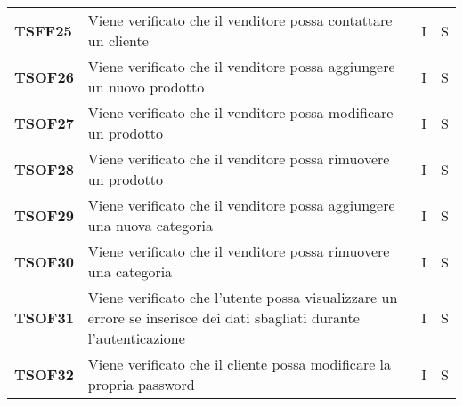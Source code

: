 \begin{center}
\begin{longtable}[!h]{p{60px} p{240px} p{35px} p{35px}}
        \textbf{TSFF25} & Viene verificato che il venditore possa contattare un cliente                                                        & I              & S              \\
        \textbf{TSOF26} & Viene verificato che il venditore possa aggiungere un nuovo prodotto                                                 & I              & S              \\
        \textbf{TSOF27} & Viene verificato che il venditore possa modificare un prodotto                                                       & I              & S              \\
        \textbf{TSOF28} & Viene verificato che il venditore possa rimuovere un prodotto                                                        & I              & S              \\
        \textbf{TSOF29} & Viene verificato che il venditore possa aggiungere una nuova categoria                                               & I              & S              \\
        \textbf{TSOF30} & Viene verificato che il venditore possa rimuovere una categoria                                                      & I              & S              \\
        \textbf{TSOF31} & Viene verificato che l'utente possa visualizzare un errore se inserisce dei dati sbagliati durante l'autenticazione  & I              & S              \\
        \textbf{TSOF32} & Viene verificato che il cliente possa modificare la propria password                                                 & I              & S              \\
    \end{longtable}
\end{center}
\pagebreak
